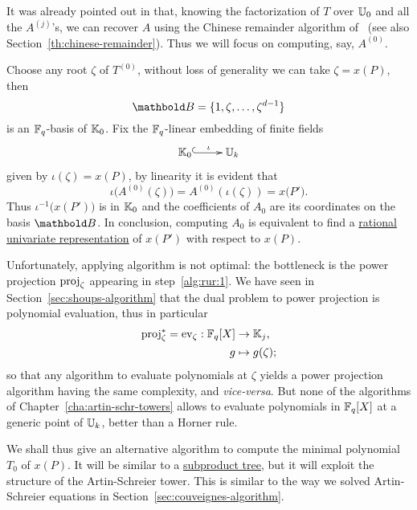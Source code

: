 It was already pointed out in \cite[$\S$2.3]{couveignes96} that,
knowing the factorization of $T$ over $\mathbb{U}_0$ and all the $A^{(j)}$'s,
we can recover $A$ using the Chinese remainder algorithm
of~\cite[$\S10$]{vzGG} (see also
Section~\ref{th:chinese-remainder}). Thus we will focus on computing,
say, $A^{(0)}$.

Choose any root $\zeta$ of $T^{(0)}$, without loss of generality we
can take $\zeta=x(P)$, then
\begin{equation}
  \label{eq:188}
  \basis{B}=\{1,\zeta,\ldots,\zeta^{d-1}\}  
\end{equation}
is an $\mathbb{F}_q$-basis of $\mathbb{K}_0$.  Fix the $\mathbb{F}_q$-linear embedding of
finite fields
\begin{equation}
  \label{eq:embed}
  \xymatrix{
    \K_0 \ar@{^{(}->}[r]^-\iota & \U_k
  }
\end{equation}
given by $\iota(\zeta) = x(P)$, by linearity it is evident that
\begin{equation}
  \iota\bigl(A^{(0)}(\zeta)\bigr) = A^{(0)}\left(\iota(\zeta)\right)=x\bigl(P'\bigr)
  \text{.}
\end{equation}
Thus $\iota^{-1}\bigl(x(P')\bigr)$ is in $\mathbb{K}_0$ and the coefficients
of $A_0$ are its coordinates on the basis $\basis{B}$. In conclusion,
computing $A_0$ is equivalent to find a \hyperref[eq:22]{rational
  univariate representation} of $x(P')$ with respect to $x(P)$.

Unfortunately, applying algorithm  is not optimal: the
bottleneck is the power projection $\operatorname{proj}_\zeta$ appearing in
step~\ref{alg:rur:1}. We have seen in
Section~\ref{sec:shoups-algorithm} that the dual problem to power
projection is polynomial evaluation, thus in particular
\begin{equation}
  \label{eq:189}
  \begin{aligned}
    \operatorname{proj}_\zeta^\ast = \operatorname{ev}_\zeta : \mathbb{F}_q[X] &\rightarrow \mathbb{K}_j\text{,}\\
    g &\mapsto g(\zeta)\text{;}
  \end{aligned}
\end{equation}
so that any algorithm to evaluate polynomials at $\zeta$ yields a
power projection algorithm having the same complexity, and
\emph{vice-versa}. But none of the algorithms of
Chapter~\ref{cha:artin-schr-towers} allows to evaluate polynomials in
$\mathbb{F}_q[X]$ at a generic point of $\mathbb{U}_k$, better than a Horner rule.

We shall thus give an alternative algorithm to compute the minimal
polynomial $T_0$ of $x(P)$. It will be similar to a
\hyperref[sec:chin-rema-algor]{subproduct tree}, but it will exploit
the structure of the Artin-Schreier tower. This is similar to the way
we solved Artin-Schreier equations in
Section~\ref{sec:couveignes-algorithm}.


